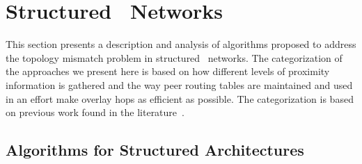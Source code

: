 \section{Structured \p\ Networks}
\label{section:structured}

This section presents a description and analysis of algorithms proposed
to address the topology mismatch problem in structured \p\ networks. The
categorization of the approaches we present here is based on how different
levels of proximity information is gathered and the way peer routing tables are
maintained and used in an effort make overlay hops as efficient as possible. The
categorization is based on previous work found in the
literature~\cite{CDHR2002,CDCR2002,RSS2002}.


\subsection{Algorithms for Structured Architectures}



